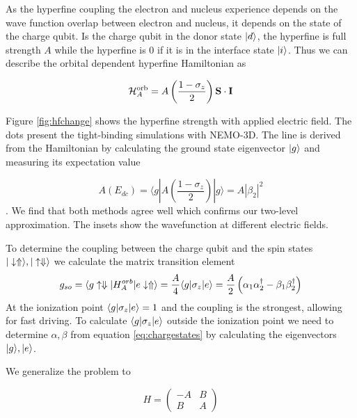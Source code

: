 As the hyperfine coupling the electron and nucleus experience depends on the wave function overlap between electron and nucleus, it depends on the state of the charge qubit. Is the charge qubit in the donor state $|d\rangle$, the hyperfine is full strength $A$ while the hyperfine is $0$ if it is in the interface state $|i\rangle$. Thus we can describe the orbital dependent hyperfine Hamiltonian as 

\begin{equation} \label{eq:H_A}
\mathcal{H}_{A}^{\rm orb}=A\left(\frac{1 - \sigma_z}{2}\right){\bf S\cdot I}
\end{equation}

Figure \ref{fig:hfchange} shows the hyperfine strength with applied electric field. The dots present the tight-binding simulations with NEMO-3D. The line is derived from the Hamiltonian by calculating the ground state eigenvector $|g\rangle$ and measuring its expectation value 

\begin{equation}\label{eq:AE}
A(E_{dc})=\langle g|A\left(\frac{1 - \sigma_z}{2}\right)|g\rangle=A|\beta_2|^2
\end{equation}. We find that both methods agree well which confirms our two-level approximation. The insets show the wavefunction at different electric fields. 

To determine the coupling between the charge qubit and the spin states $|\downarrow\Uparrow\rangle, |\uparrow\Downarrow\rangle$ we calculate the matrix transition element 
\begin{equation}\label{eq:g_so}
g_{so}=\langle g\uparrow\Downarrow|H_{A}^{orb}|e\downarrow\Uparrow\rangle=\frac{A}{4}\langle g|\sigma_z|e\rangle =\frac{A}{2}\left(\alpha_1\alpha_2^\dagger-\beta_1\beta_2^\dagger\right)
\end{equation}
At the ionization point $\langle g|\sigma_z|e\rangle=1$ and the coupling is the strongest, allowing for fast driving. To calculate $\langle g|\sigma_z|e\rangle$ outside the ionization point we need to determine $\alpha,\beta$ from equation \eqref{eq:chargestates} by calculating the eigenvectors $|g\rangle,|e\rangle$. 

We generalize the problem to 

\begin{equation}
H=\begin{pmatrix}
-A & B\\
B & A
\end{pmatrix}
\end{equation}

